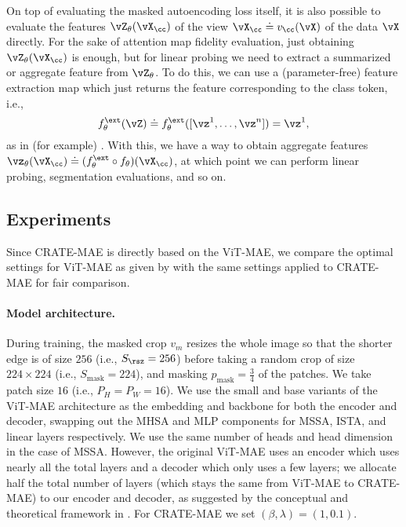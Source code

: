 \documentclass[../../book-main.tex]{subfiles}
\begin{document}
On top of evaluating the masked autoencoding loss itself, it is also possible to evaluate the features \(\vZ_{\theta}(\vX_{\cc})\) of the view \(\vX_{\cc} \doteq v_{\cc}(\vX)\) of the data \(\vX\) directly. For the sake of attention map fidelity evaluation, just obtaining \(\vZ_{\theta}(\vX_{\cc})\) is enough, but for linear probing we need to extract a summarized or aggregate feature from \(\vZ_{\theta}\). To do this, we can use a (parameter-free) feature extraction map which just returns the feature corresponding to the class token, i.e.,
\begin{equation}
    f_{\theta}^{\ext}(\vZ) \doteq f_{\theta}^{\ext}([\vz^{1}, \dots, \vz^{n}]) = \vz^{1},
\end{equation}
as in (for example) . With this, we have a way to obtain aggregate features \(\vz_{\theta}(\vX_{\cc}) \doteq (f_{\theta}^{\ext} \circ f_{\theta})(\vX_{\cc})\), at which point we can perform linear probing, segmentation evaluations, and so on.

\subsection{Experiments}\label{sub:image_completion_experiments}

Since CRATE-MAE is directly based on the ViT-MAE, we compare the optimal settings for ViT-MAE as given by \citep{he2022masked} with the same settings applied to CRATE-MAE for fair comparison.

\paragraph{Model architecture.} During training, the masked crop \(v_{m}\) resizes the whole image so that the shorter edge is of size \(256\) (i.e., \(S_{\rsz} = 256\)) before taking a random crop of size \(224 \times 224\) (i.e., \(S_{\mathrm{mask}} = 224\)), and masking \(p_{\mathrm{mask}} = \frac{3}{4}\) of the patches. We take patch size \(16\) (i.e., \(P_{H} = P_{W} = 16\)). We use the small and base variants of the ViT-MAE architecture as the embedding and backbone for both the encoder and decoder, swapping out the MHSA and MLP components for MSSA, ISTA, and linear layers respectively. We use the same number of heads and head dimension in the case of MSSA. However, the original ViT-MAE uses an encoder which uses nearly all the total layers and a decoder which only uses a few layers; we allocate half the total number of layers (which stays the same from ViT-MAE to CRATE-MAE) to our encoder and decoder, as suggested by the conceptual and theoretical framework in . For CRATE-MAE we set \((\beta, \lambda) = (1, 0.1)\).
\end{document}
